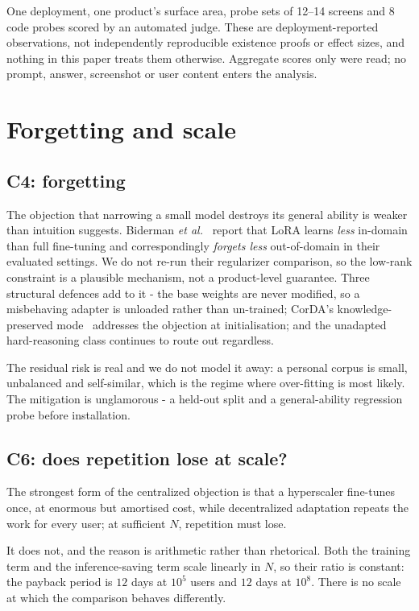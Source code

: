 \documentclass[conference]{IEEEtran}
\begin{document}
One deployment, one product's surface area, probe sets of 12--14 screens and 8
code probes scored by an automated judge. These are deployment-reported
observations, not independently reproducible existence proofs or effect sizes,
and nothing in this paper treats them otherwise. Aggregate scores only were
read; no prompt, answer, screenshot or user content enters the analysis.

\section{Forgetting and scale}
\label{sec:scale}

\subsection{C4: forgetting}

The objection that narrowing a small model destroys its general ability is
weaker than intuition suggests. Biderman \emph{et al.}~\cite{biderman2024lora}
report that LoRA learns \emph{less} in-domain than full fine-tuning and
correspondingly \emph{forgets less} out-of-domain in their evaluated settings.
We do not re-run their regularizer comparison, so the low-rank constraint is a
plausible mechanism, not a product-level guarantee. Three structural
defences add to it - the base weights are never modified, so a misbehaving
adapter is unloaded rather than un-trained; CorDA's knowledge-preserved
mode~\cite{yang2024corda} addresses the objection at initialisation; and the
unadapted hard-reasoning class continues to route out regardless.

The residual risk is real and we do not model it away: a personal corpus is
small, unbalanced and self-similar, which is the regime where over-fitting is
most likely. The mitigation is unglamorous - a held-out split and a
general-ability regression probe before installation.

\subsection{C6: does repetition lose at scale?}

The strongest form of the centralized objection is that a hyperscaler fine-tunes
once, at enormous but amortised cost, while decentralized adaptation repeats the
work for every user; at sufficient $N$, repetition must lose.

It does not, and the reason is arithmetic rather than rhetorical. Both the
training term and the inference-saving term scale linearly in $N$, so their
ratio is constant: the payback period is $12$ days at $10^5$ users and $12$ days
at $10^8$. There is no scale at which the comparison behaves differently.
\end{document}
